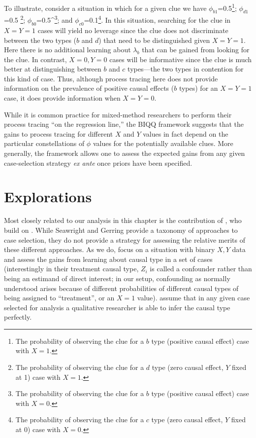 \documentclass[12pt,]{book}
\let\rmarkdownfootnote\footnote%
\def\footnote{\protect\rmarkdownfootnote}
\begin{document}
To illustrate, consider a situation in which for a given clue we have \(\phi_{b1}\)=0.5\footnote{The probability of observing the clue for a \(b\) type (positive causal effect) case with \(X=1\).}; \(\phi_{d1}\)=0.5 \footnote{The probability of observing the clue for a \(d\) type (zero causal effect, \(Y\) fixed at 1) case with \(X=1\).}; \(\phi_{b0}\)=0.5\^{}\footnote{The probability of observing the clue for a \(b\) type (positive causal effect) case with \(X=0\).}; and \(\phi_{c0}\)=0.1\footnote{The probability of observing the clue for a \(c\) type (zero causal effect, \(Y\) fixed at 0) case with \(X=0\).}. In this situation, searching for the clue in \(X=Y=1\) cases will yield no leverage since the clue does not discriminate between the two types (\(b\) and \(d\)) that need to be distinguished given \(X=Y=1\). Here there is no additional learning about \(\lambda_b\) that can be gained from looking for the clue. In contrast, \(X=0, Y=0\) cases will be informative since the clue is much better at distinguishing between \(b\) and \(c\) types---the two types in contention for this kind of case. Thus, although process tracing here does not provide information on the prevalence of positive causal effects (\(b\) types) for an \(X=Y=1\) case, it does provide information when \(X=Y=0\).

While it is common practice for mixed-method researchers to perform their process tracing ``on the regression line,'' the BIQQ framework suggests that the gains to process tracing for different \(X\) and \(Y\) values in fact depend on the particular constellations of \(\phi\) values for the potentially available clues. More generally, the framework allows one to assess the expected gains from any given case-selection strategy \emph{ex ante} once priors have been specified.

\hypertarget{explorations}{%
\section{Explorations}\label{explorations}}

Most closely related to our analysis in this chapter is the contribution of \citet{HerronQuinn}, who build on \citet{SeawrightGerring2008}. While Seawright and Gerring provide a taxonomy of approaches to case selection, they do not provide a strategy for assessing the relative merits of these different approaches. As we do, \citet{HerronQuinn} focus on a situation with binary \(X,Y\) data and assess the gains from learning about causal type in a set of cases (interestingly in their treatment causal type, \(Z_i\) is called a confounder rather than being an estimand of direct interest; in our setup, confounding as normally understood arises because of different probabilities of different causal types of being assigned to ``treatment'', or an \(X=1\) value). \citet{HerronQuinn} assume that in any given case selected for analysis a qualitative researcher is able to infer the causal type perfectly.
\end{document}
